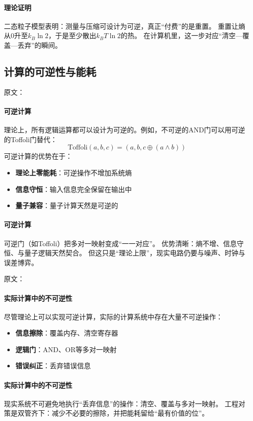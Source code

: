 \paragraph{理论证明}
二态粒子模型表明：测量与压缩可设计为可逆，真正“付费”的是重置。  
重置让熵从$0$升至$k_B\ln2$，于是至少散出$k_BT\ln2$的热。  
在计算机里，这一步对应“清空—覆盖—丢弃”的瞬间。

\subsection{计算的可逆性与能耗}

原文：
\paragraph{可逆计算}
理论上，所有逻辑运算都可以设计为可逆的。例如，不可逆的AND门可以用可逆的Toffoli门替代：
$$\text{Toffoli}(a,b,c) = (a, b, c \oplus (a \land b))$$
可逆计算的优势在于：
\begin{itemize}
\item \textbf{理论上零能耗}：可逆操作不增加系统熵
\item \textbf{信息守恒}：输入信息完全保留在输出中
\item \textbf{量子兼容}：量子计算天然是可逆的
\end{itemize}
\paragraph{可逆计算}
可逆门（如Toffoli）把多对一映射变成“一一对应”。  
优势清晰：熵不增、信息守恒、与量子逻辑天然契合。  
但这只是“理论上限”，现实电路仍要与噪声、时钟与误差博弈。

原文：
\paragraph{实际计算中的不可逆性}
尽管理论上可以实现可逆计算，实际的计算系统中存在大量不可逆操作：
\begin{itemize}
\item \textbf{信息擦除}：覆盖内存、清空寄存器
\item \textbf{逻辑门}：AND、OR等多对一映射
\item \textbf{错误纠正}：丢弃错误信息
\end{itemize}
\paragraph{实际计算中的不可逆性}
现实系统不可避免地执行“丢弃信息”的操作：清空、覆盖与多对一映射。  
工程对策是双管齐下：减少不必要的擦除，并把能耗留给“最有价值的位”。

